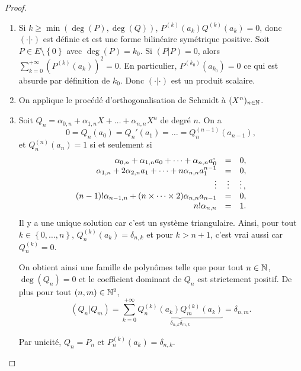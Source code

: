 \documentclass[12pt]{article}
\begin{document}
\begin{proof}
	\phantom{}
	\begin{enumerate}
		\item Si $k\geqslant\min(\deg(P),\deg(Q))$, $P^{(k)}(a_k)Q^{(k)}(a_k)=0$, donc $(\cdot|\cdot)$ est définie et est une forme bilinéaire symétrique positive.
		Soit $P\in E\setminus\left\lbrace0\right\rbrace$ avec $\deg(P)=k_{0}$. Si $(P|P)=0$, alors $\sum_{k=0}^{+\infty}\left(P^{(k)}(a_k)\right)^{2}=0$. En particulier, $P^{(k_0)}(a_{k_0})=0$ ce qui est absurde par définition de $k_0$. Donc $(\cdot|\cdot)$ est un produit scalaire.

		\item On applique le procédé d'orthogonalisation de Schmidt à $(X^{n})_{n\in\mathbb{N}}$.
		\item Soit $Q_n=\alpha_{0,n}+\alpha_{1,n}X+\dots+\alpha_{n,n}X^{n}$ de degré $n$. On a 
		\begin{equation}
			0=Q_n(a_0)=Q_n'(a_1)=\dots=Q_n^{(n-1)}(a_{n-1}),
		\end{equation}
		et $Q_n^{(n)}(a_n)=1$ si et seulement si 
		\begin{equation}
			\begin{array}[]{rcl}
				\alpha_{0,n}+\alpha_{1,n}a_{0}+\dots + \alpha_{n,n}a_{0}^{,}&=&0,\\
				\alpha_{1,n}+2\alpha_{2,n}a_{1}+\dots+n\alpha_{n,n}a_{1}^{n-1}&=&0,\\
				\vdots&\vdots&\vdots,\\
				(n-1)!\alpha_{n-1,n}+(n\times\dots\times2)\alpha_{n,n}a_{n-1}&=&0,\\
				n!\alpha_{n,n}&=&1.
			\end{array}
		\end{equation}
		Il y a une unique solution car c'est un système triangulaire. Ainsi, pour tout $k\in\left\lbrace0,\dots,n\right\rbrace$, $Q_n^{(k)}(a_k)=\delta_{n,k}$ et pour $k>n+1$, c'est vrai aussi car $Q_n^{(k)}=0$.

		On obtient ainsi une famille de polynômes telle que pour tout $n\in\mathbb{N}$, $\deg(Q_n)=0$ et le coefficient dominant de $Q_n$ est strictement positif. De plus pour tout $(n,m)\in\mathbb{N}^{2}$,
		\begin{equation}
			(Q_n|Q_m)=\sum_{k=0}^{+\infty}\underbrace{Q_n^{(k)}(a_k)Q_m^{(k)}(a_k)}_{\delta_{n,k}\delta_{m,k}}=\delta_{n,m}.
		\end{equation}

		Par unicité, $Q_n=P_n$ et $P_n^{(k)}(a_k)=\delta_{n,k}$.


\end{enumerate}
\end{proof}
\end{document}

